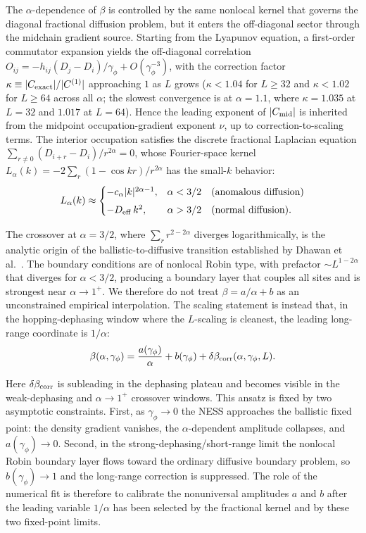 \documentclass[aps,prd,twocolumn,superscriptaddress,floatfix]{revtex4-2}
\begin{document}
The $\alpha$-dependence of $\beta$ is controlled by the same nonlocal
kernel that governs the diagonal fractional diffusion problem, but it
enters the off-diagonal sector through the midchain gradient source.
Starting from the Lyapunov equation, a first-order commutator
expansion yields the off-diagonal correlation
$O_{ij} = -h_{ij}(D_j-D_i)/\gamma_\phi + O(\gamma_\phi^{-3})$, with
the correction factor $\kappa \equiv |C_{\rm exact}|/|C^{(1)}|$
approaching $1$ as $L$ grows ($\kappa < 1.04$ for $L \geq 32$ and
$\kappa < 1.02$ for $L \geq 64$ across all $\alpha$; the slowest
convergence is at $\alpha = 1.1$, where $\kappa = 1.035$ at $L = 32$
and $1.017$ at $L = 64$). Hence the leading exponent of $|C_{\rm
mid}|$ is inherited from the midpoint occupation-gradient exponent
$\nu$, up to correction-to-scaling terms. The interior occupation
satisfies the discrete fractional Laplacian equation
$\sum_{r\neq 0} (D_{i+r}-D_i)/r^{2\alpha} = 0$, whose Fourier-space
kernel $L_\alpha(k) = -2\sum_r (1-\cos kr)/r^{2\alpha}$ has the
small-$k$ behavior:
\begin{equation}
L_\alpha(k) \approx
\begin{cases}
-c_\alpha |k|^{2\alpha-1}, & \alpha < 3/2 \quad\text{(anomalous diffusion)} \\[4pt]
-D_{\rm eff}\, k^2,        & \alpha > 3/2 \quad\text{(normal diffusion)}.
\end{cases}
\label{eq:fractional_kernel}
\end{equation}

The crossover at $\alpha = 3/2$, where $\sum_r r^{2-2\alpha}$ diverges
logarithmically, is the analytic origin of the ballistic-to-diffusive
transition established by Dhawan et al.~\cite{Dhawan2024}. The
boundary conditions are of nonlocal Robin type, with prefactor
$\sim L^{1-2\alpha}$ that diverges for $\alpha < 3/2$, producing a
boundary layer that couples all sites and is strongest near
$\alpha \to 1^+$. We therefore do not treat $\beta = a/\alpha + b$ as
an unconstrained empirical interpolation. The scaling statement is
instead that, in the hopping-dephasing window where the $L$-scaling is
cleanest, the leading long-range coordinate is $1/\alpha$:
\begin{equation}
\beta(\alpha,\gamma_\phi)
= \frac{a(\gamma_\phi)}{\alpha}
+ b(\gamma_\phi)
+ \delta\beta_{\rm corr}(\alpha,\gamma_\phi,L).
\label{eq:beta_ansatz}
\end{equation}

Here $\delta\beta_{\rm corr}$ is subleading in the dephasing plateau
and becomes visible in the weak-dephasing and $\alpha \to 1^+$
crossover windows. This ansatz is fixed by two asymptotic constraints.
First, as $\gamma_\phi \to 0$ the NESS approaches the ballistic fixed
point: the density gradient vanishes, the $\alpha$-dependent amplitude
collapses, and $a(\gamma_\phi) \to 0$. Second, in the
strong-dephasing/short-range limit the nonlocal Robin boundary layer
flows toward the ordinary diffusive boundary problem, so
$b(\gamma_\phi) \to 1$ and the long-range correction is suppressed.
The role of the numerical fit is therefore to calibrate the
nonuniversal amplitudes $a$ and $b$ after the leading variable
$1/\alpha$ has been selected by the fractional kernel and by these two
fixed-point limits.
\end{document}

